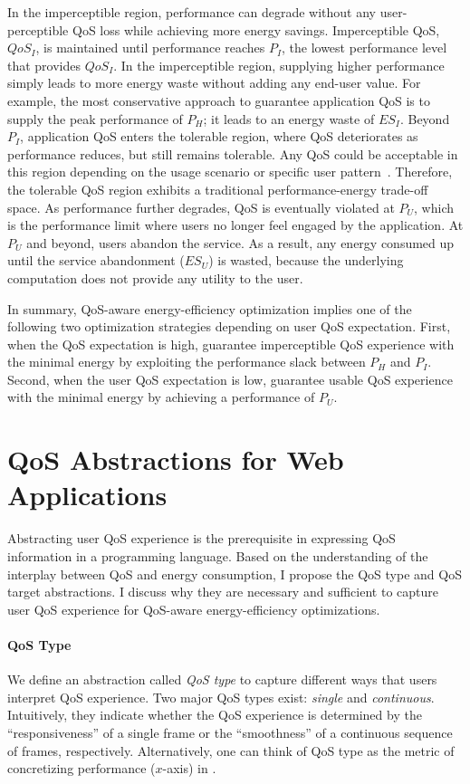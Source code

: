 In the imperceptible region, performance can degrade without any user-perceptible QoS loss while achieving more energy savings. Imperceptible QoS, $QoS_I$, is maintained until performance reaches $P_I$, the lowest performance level that provides $QoS_I$. In the imperceptible region, supplying higher performance simply leads to more energy waste without adding any end-user value. For example, the most conservative approach to guarantee application QoS is to supply the peak performance of $P_H$; it leads to an energy waste of $ES_I$. Beyond $P_I$, application QoS enters the tolerable region, where QoS deteriorates as performance reduces, but still remains tolerable. Any QoS could be acceptable in this region depending on the usage scenario or specific user pattern~\cite{usagepattern, satscore}. Therefore, the tolerable QoS region exhibits a traditional performance-energy trade-off space. As performance further degrades, QoS is eventually violated at $P_U$, which is the performance limit where users no longer feel engaged by the application. At $P_U$ and beyond, users abandon the service. As a result, any energy consumed up until the service abandonment ($ES_U$) is wasted, because the underlying computation does not provide any utility to the user.

In summary, QoS-aware energy-efficiency optimization implies one of the following two optimization strategies depending on user QoS expectation. First, when the QoS expectation is high, guarantee imperceptible QoS experience with the minimal energy by exploiting the performance slack between $P_H$ and $P_I$. Second, when the user QoS expectation is low, guarantee usable QoS experience with the minimal energy by achieving a performance of $P_U$.

\section{QoS Abstractions for Web Applications}
\label{sec:lang:abst}

Abstracting user QoS experience is the prerequisite in expressing QoS information in a programming language. Based on the understanding of the interplay between QoS and energy consumption, I propose the QoS type and QoS target abstractions. I discuss why they are necessary and sufficient to capture user QoS experience for QoS-aware energy-efficiency optimizations.

\paragraph{QoS Type} We define an abstraction called \textit{QoS type} to capture different ways that users interpret QoS experience. Two major QoS types exist: \textit{single} and \textit{continuous}. Intuitively, they indicate whether the QoS experience is determined by the ``responsiveness'' of a single frame or the ``smoothness'' of a continuous sequence of frames, respectively. Alternatively, one can think of QoS type as the metric of concretizing performance ($x$-axis) in .

